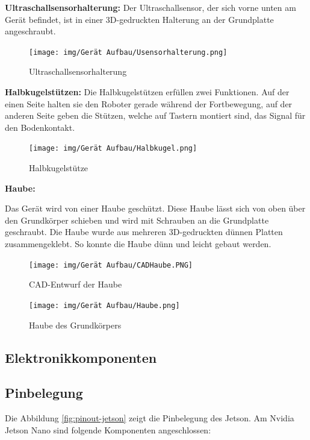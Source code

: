 \textbf{Ultraschallsensorhalterung:} Der Ultraschallsensor, der sich vorne unten am Gerät befindet, ist in einer 3D-gedruckten Halterung an der Grundplatte angeschraubt.

\begin{figure}[H]
  \texttt{[image: img/Gerät Aufbau/Usensorhalterung.png]}
  \centering
  \caption{Ultraschallsensorhalterung}
  \label{fig:Uschallsensorhalterung}
\end{figure}

\textbf{Halbkugelstützen:} Die Halbkugelstützen erfüllen zwei Funktionen. Auf der einen Seite halten sie den Roboter gerade während der Fortbewegung, auf der anderen Seite geben die Stützen, welche auf Tastern montiert sind, das Signal für den Bodenkontakt.

\begin{figure}[H]
  \texttt{[image: img/Gerät Aufbau/Halbkugel.png]}
  \centering
  \caption{Halbkugelstütze}
  \label{fig:Halbkugelstütze}
\end{figure}

\newpage

\textbf{Haube:}

Das Gerät wird von einer Haube geschützt. Diese Haube lässt sich von oben über den Grundkörper schieben und wird mit Schrauben an die Grundplatte geschraubt. Die Haube wurde aus mehreren 3D-gedruckten dünnen Platten zusammengeklebt. So konnte die Haube dünn und leicht gebaut werden.

\begin{figure}[H]
  \texttt{[image: img/Gerät Aufbau/CADHaube.PNG]}
  \centering
  \caption{CAD-Entwurf der Haube}
  \label{fig:Haube}
\end{figure}

\begin{figure}[H]
  \texttt{[image: img/Gerät Aufbau/Haube.png]}
  \centering
  \caption{Haube des Grundkörpers}
  \label{fig:Haube}
\end{figure}






\newpage

\subsection{Elektronikkomponenten}
\subsection{Pinbelegung}
Die Abbildung \ref{fig:pinout-jetson} zeigt die Pinbelegung des Jetson. Am Nvidia Jetson Nano sind folgende Komponenten angeschlossen:

